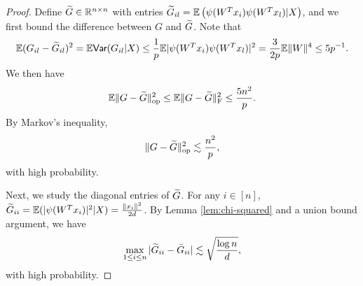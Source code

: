 \begin{proof}
Define $\widetilde{G}\in\mathbb{R}^{n\times n}$ with entries $\widetilde{G}_{il}=\mathbb{E}\left(\psi(W^Tx_i)\psi(W^Tx_l)|X\right)$, and we first bound the difference between $G$ and $\widetilde{G}$. Note that
$$\mathbb{E}(G_{il}-\widetilde{G}_{il})^2 = \mathbb{E}\textsf{Var}(G_{il}|X) \leq \frac{1}{p}\mathbb{E}|\psi(W^Tx_i)\psi(W^Tx_l)|^2=\frac{3}{2p}\mathbb{E}\|W\|^4\leq 5p^{-1}.$$
We then have
$$
\mathbb{E}\|G-\widetilde{G}\|_{\rm op}^2 \leq \mathbb{E}\|G-\widetilde{G}\|_{\rm F}^2 \leq \frac{5n^2}{p}.
$$
By Markov's inequality,
\begin{equation}
\opnorm{G-\wt{G}}^2 \lesssim \frac{n^2}{p}, \label{eq:G-G-tilde-relu}
\end{equation}
with high probability.

Next, we study the diagonal entries of $\widetilde{G}$. For any $i\in[n]$, $\widetilde{G}_{ii}=\mathbb{E}(|\psi(W^Tx_i)|^2|X)=\frac{\|x_i\|^2}{2d}$. By Lemma \ref{lem:chi-squared} and a union bound argument, we have
\begin{equation}
\max_{1\leq i\leq n}|\wt{G}_{ii}-\bar{G}_{ii}|\lesssim \sqrt{\frac{\log n}{d}}, \label{eq:G-diag-relu}
\end{equation}
with high probability.


\end{proof}
